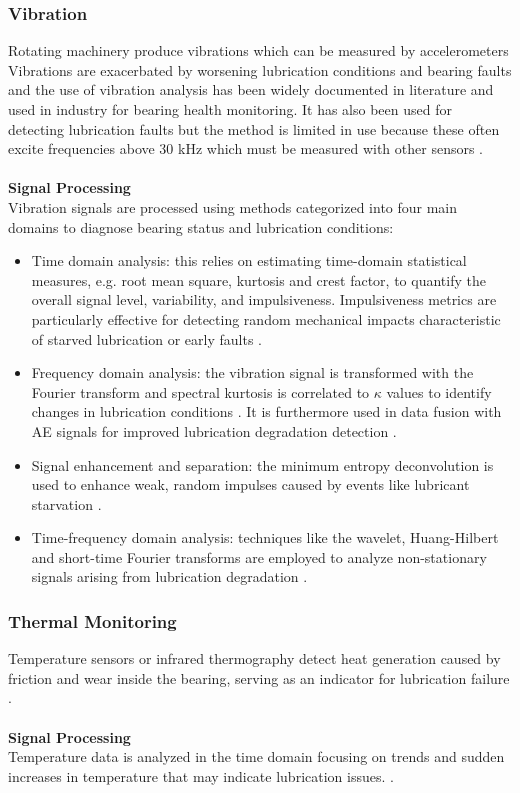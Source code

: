 \subsubsection{Vibration}
Rotating machinery produce vibrations which can be measured by accelerometers Vibrations are exacerbated by worsening lubrication conditions and bearing faults and the use of vibration analysis has been widely documented in literature and used in industry for bearing health monitoring. It has also been used for detecting lubrication faults but the method is limited in use because these often excite frequencies above 30 kHz which must be measured with other sensors \cite{jakobsen_detecting_2023} \cite{zhang_graph-data-based_2024}.
\\\\
\textbf{Signal Processing}\\
Vibration signals are processed using methods categorized into four main domains to diagnose bearing status and lubrication conditions:
\begin{itemize}
    \item Time domain analysis: this relies on estimating time-domain statistical measures, e.g. root mean square, kurtosis and crest factor, to quantify the overall signal level, variability, and impulsiveness. Impulsiveness metrics are particularly effective for detecting random mechanical impacts characteristic of starved lubrication or early faults \cite{zhang_graph-data-based_2024} \cite{jakobsen_detecting_2023} \cite{xu_vibration-based_2024}.
    \item Frequency domain analysis: the vibration signal is transformed with the Fourier transform and spectral kurtosis is correlated to $\kappa$ values to identify changes in lubrication conditions \cite{jakobsen_detecting_2023}. It is furthermore used in data fusion with AE signals for improved lubrication degradation detection \cite{zhang_graph-data-based_2024}.
    \item Signal enhancement and separation: the minimum entropy deconvolution is used to enhance weak, random impulses caused by events like lubricant starvation \cite{xu_vibration-based_2024}.
    \item Time-frequency domain analysis: techniques like the wavelet, Huang-Hilbert and short-time Fourier transforms are employed to analyze non-stationary signals arising from lubrication degradation \cite{wang_advanced_2024}.
\end{itemize}

\subsubsection{Thermal Monitoring}
Temperature sensors or infrared thermography detect heat generation caused by friction and wear inside the bearing, serving as an indicator for lubrication failure \cite{zhang_graph-data-based_2024} \cite{wang_advanced_2024}.
\\\\
\textbf{Signal Processing}\\
Temperature data is analyzed in the time domain focusing on trends and sudden increases in temperature that may indicate lubrication issues. \cite{moussa_passive_2017}.

